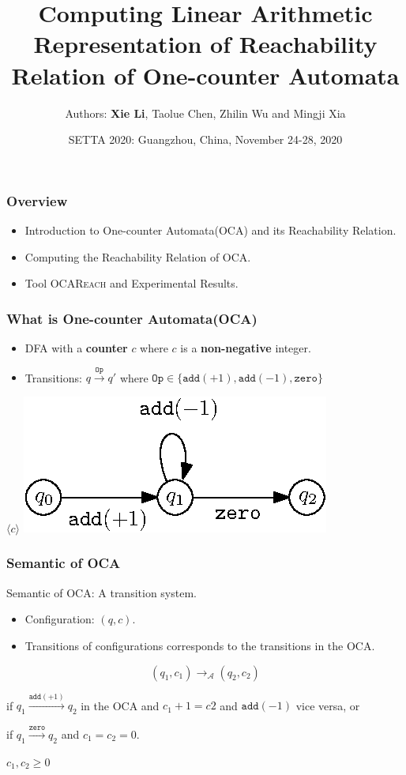 \documentclass[11pt]{beamer}
\title{Computing Linear Arithmetic Representation of Reachability Relation  of One-counter Automata}
\author{
    Authors: \textbf{Xie Li}, Taolue Chen, Zhilin Wu and Mingji Xia
}
\date{SETTA 2020: Guangzhou, China, November 24-28, 2020}
\begin{document}
\maketitle
\begin{frame}\frametitle{Overview}
\begin{itemize}
\item Introduction to One-counter Automata(OCA) and its Reachability Relation.
\pause
\item Computing the Reachability Relation of OCA.
\pause
\item Tool \textsc{OCAReach} and Experimental Results.

\end{itemize}
\end{frame}


\begin{frame}\frametitle{What is One-counter Automata(OCA)}
\begin{itemize}

\item DFA with a \textbf{counter} $c$ where $c$ is a \textbf{non-negative} integer.
\pause
\item Transitions: $q\stackrel{\texttt{Op}}{\rightarrow} q'$ where $\texttt{Op}\in \{\texttt{add}(+1), \texttt{add}(-1), \texttt{zero}\}$
\end{itemize}
\pause
\begin{example}[OCA]
\begin{center}
$\langle c\rangle$
\includegraphics[scale=1]{ocaexample.eps}
\end{center}


\end{example}

\end{frame}
\begin{frame}\frametitle{Semantic of OCA}

Semantic of OCA: A transition system.
\begin{itemize}

\item Configuration: $(q,c)$.

\item Transitions of configurations corresponds to the transitions in the OCA.

\end{itemize}
\[(q_1, c_1) \rightarrow_\mathcal{A} (q_2,c_2)\]

if $q_1 \stackrel{\texttt{add}(+1)}{\longrightarrow} q_2$ in the OCA and $c_1 + 1 = c2$ and $\texttt{add}(-1)$ vice versa, or

if $q_1 \stackrel{\texttt{zero}}{\longrightarrow} q_2$ and $c_1 = c_2 = 0$.


$c_1, c_2 \ge 0$
\end{frame}
\end{document}
